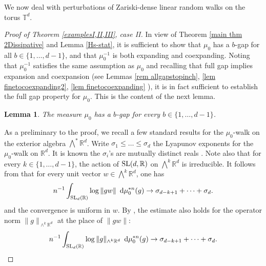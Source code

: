 \documentclass[11pt, leqno, fleqn]{amsart}
\def\SL{   {\rm SL}}
\def \R{{\mathbb R}}
\newcommand{\T}{{\mathbb T}}
\newcommand{\dd}{\,\mathrm{d}}
\newtheorem{lemma}[thm]{\bf Lemma}
\theoremstyle{definition}
\theoremstyle{definition}
\begin{document}
	We now deal with perturbations of Zariski-dense linear random walks on the torus $\T^d$.
		
	\begin{proof}[Proof of Theorem \ref{examplesI,II,III}, case II]
		

		In view of Theorem \ref{main thm 2Dissipative} and Lemma \ref{Hs-stat}, it is sufficient to show that $\mu_{0}$ has a $b$-gap for all 
		 $b\in \{1, \dots, d-1\}$, and that $\mu_{0}^{-1}$ is both expanding and coexpanding. Noting that $\mu_{0}^{-1}$ satisfies the same assumption as $\mu_{0}$ and recalling that full gap implies expansion and coexpansion (see Lemmas \ref{rem allgapstopinch}, \ref{lem finetocoexpanding2}, \ref{lem finetocoexpanding} ), it is in fact sufficient to establish the full gap property for $\mu_{0}$. This is the content of the next lemma. 
		
		\begin{lemma}  \label{lem mu0neighborhoodfine}
			The measure $\mu_{0}$ has a $b$-gap for every $b\in \{1, \dots, d-1\}$.
		\end{lemma}
		
		As a preliminary to the proof, we recall a few standard results for the $\mu_{0}$-walk on the exterior algebra $\bigwedge^*\R^d$. 
		Write $\sigma_{1}\leq \dots\leq \sigma_{d}$ the Lyapunov exponents for the $\mu_{0}$-walk on $\R^d$. It is known the $\sigma_{i}$'s are mutually distinct reals \cite[Corollary 10.15]{BQ}. Note also that for every $k\in \{1, \dots, d-1\}$, the action of $\SL(d, \R)$ on  $\bigwedge^k\R^d$ is irreducible. It follows from \cite[Theorem 14.20]{BQ} that for every unit vector $w\in \bigwedge^k\R^d$, one has 
			\begin{align}\label{eq-cv-L1-LLN}
				n^{-1}\int_{\SL_{d}(\R)} \log \|gw\| \,\,\dd\mu_{0}^{*n}(g) \rightarrow \sigma_{d-k+1}+\dots +\sigma_{d}.
			\end{align}
			and the convergence is uniform in $w$. By \cite[Theorem 14.19]{BQ}, the estimate also holds for the operator norm $\|g\|_{\wedge^{k}\R^d}$ at the place of $ \|gw\|$: 
			\begin{align}\label{eq-cv-norm-LLN}
				n^{-1}\int_{\SL_{d}(\R)} \log \|g\|_{\wedge^{k}\R^d} \,\,\dd\mu_{0}^{*n}(g) \rightarrow \sigma_{d-k+1}+\dots +\sigma_{d}.
			\end{align}		
		

\end{proof}
\end{document}

